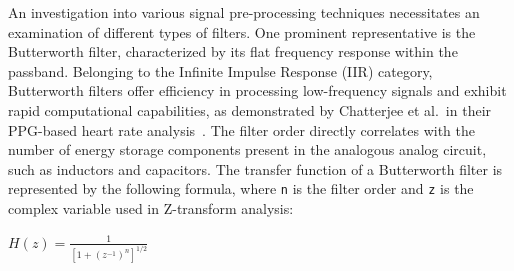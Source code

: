 An investigation into various signal pre-processing techniques necessitates an examination of different types of filters.
One prominent representative is the Butterworth filter, characterized by its flat frequency response within the passband.
Belonging to the Infinite Impulse Response (IIR) category, Butterworth filters offer efficiency in processing low-frequency signals and exhibit rapid computational capabilities, as demonstrated by Chatterjee et al.\ in their PPG-based heart rate analysis~\cite{chatterjeePPGBasedHeart2018}.
The filter order directly correlates with the number of energy storage components present in the analogous analog circuit, such as inductors and capacitors.
The transfer function of a Butterworth filter is represented by the following formula, where \texttt{n} is the filter order and \texttt{z} is the complex variable used in Z-transform analysis:~
\Large
\begin{center}
    \begin{math}
        H(z) = \frac{1}{[1 + (z^{-1})^{n}]^{1/2}}
    \end{math}
\end{center}
\normalsize

